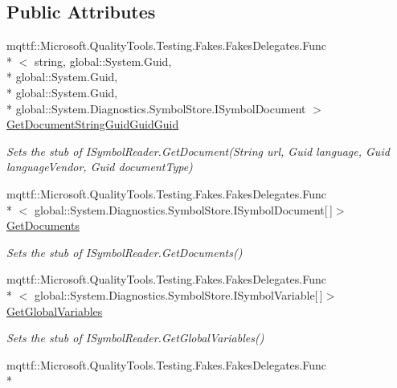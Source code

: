 \subsection*{Public Attributes}
\begin{DoxyCompactItemize}
\item 
mqttf\-::\-Microsoft.\-Quality\-Tools.\-Testing.\-Fakes.\-Fakes\-Delegates.\-Func\\*
$<$ string, global\-::\-System.\-Guid, \\*
global\-::\-System.\-Guid, \\*
global\-::\-System.\-Guid, \\*
global\-::\-System.\-Diagnostics.\-Symbol\-Store.\-I\-Symbol\-Document $>$ \hyperlink{class_system_1_1_diagnostics_1_1_symbol_store_1_1_fakes_1_1_stub_i_symbol_reader_ae46eba3c8c11076bce6ad7cbd35e779f}{Get\-Document\-String\-Guid\-Guid\-Guid}
\begin{DoxyCompactList}\small\item\em Sets the stub of I\-Symbol\-Reader.\-Get\-Document(\-String url, Guid language, Guid language\-Vendor, Guid document\-Type)\end{DoxyCompactList}\item 
mqttf\-::\-Microsoft.\-Quality\-Tools.\-Testing.\-Fakes.\-Fakes\-Delegates.\-Func\\*
$<$ global\-::\-System.\-Diagnostics.\-Symbol\-Store.\-I\-Symbol\-Document\mbox{[}$\,$\mbox{]}$>$ \hyperlink{class_system_1_1_diagnostics_1_1_symbol_store_1_1_fakes_1_1_stub_i_symbol_reader_afb1056683dcf093a0d3d9399418bb776}{Get\-Documents}
\begin{DoxyCompactList}\small\item\em Sets the stub of I\-Symbol\-Reader.\-Get\-Documents()\end{DoxyCompactList}\item 
mqttf\-::\-Microsoft.\-Quality\-Tools.\-Testing.\-Fakes.\-Fakes\-Delegates.\-Func\\*
$<$ global\-::\-System.\-Diagnostics.\-Symbol\-Store.\-I\-Symbol\-Variable\mbox{[}$\,$\mbox{]}$>$ \hyperlink{class_system_1_1_diagnostics_1_1_symbol_store_1_1_fakes_1_1_stub_i_symbol_reader_a2cc7f47e7d60227b6fd28b90952b2587}{Get\-Global\-Variables}
\begin{DoxyCompactList}\small\item\em Sets the stub of I\-Symbol\-Reader.\-Get\-Global\-Variables()\end{DoxyCompactList}\item 
mqttf\-::\-Microsoft.\-Quality\-Tools.\-Testing.\-Fakes.\-Fakes\-Delegates.\-Func\\*

\end{DoxyCompactItemize}
